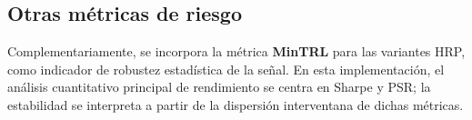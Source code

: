 \subsection{Otras métricas de riesgo}
\label{subsec:otras_metricas_riesgo}
Complementariamente, se incorpora la métrica \textbf{\gls{MinTRL}} para las variantes \gls{HRP}, como indicador de robustez estadística de la señal. En esta implementación, el análisis cuantitativo principal de rendimiento se centra en Sharpe y \gls{PSR}; la estabilidad se interpreta a partir de la dispersión interventana de dichas métricas.